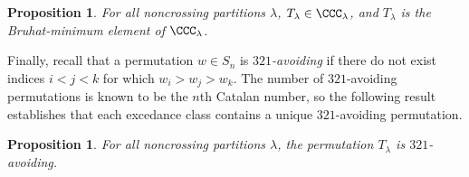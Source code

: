 \documentclass[submission]{FPSAC2024}
\newtheorem{prop}[equation]{Proposition}
\theoremstyle{definition}
\theoremstyle{remark}
\numberwithin{equation}{section}
\renewcommand{\setminus}{-}
\newcommand{\EP}{E_{pos}}
\newcommand{\EV}{E_{val}}
\begin{document}
\begin{prop}
\label{prop:321avoid}
For all noncrossing partitions $\lambda$, $T_{\lambda} \in \CCC_{\lambda}$, and $T_{\lambda}$ is the Bruhat-minimum element of $\CCC_{\lambda}$.
\end{prop}
%

Finally, recall that a permutation $w \in S_{n}$ is \emph{$321$-avoiding} if there do not exist indices $i < j < k$ for which $w_{i} > w_{j} > w_{k}$.  The number of $321$-avoiding permutations is known to be the $n$th Catalan number, so the following result establishes that each excedance class contains a unique $321$-avoiding permutation.

\begin{prop}
\label{prop:Tlambda321}
For all noncrossing partitions $\lambda$, the permutation $T_{\lambda}$ is $321$-avoiding.
\end{prop}
\end{document}

